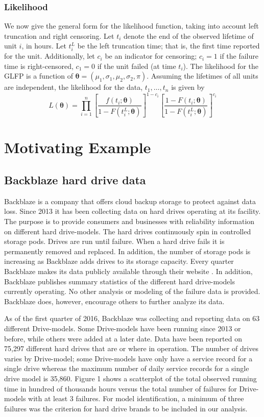 \documentclass[12pt]{article}
\begin{document}
\subsubsection{Likelihood}
We now give the general form for the likelihood function, taking into account left truncation and right censoring.  Let $t_{i}$ denote the end of the observed lifetime of unit $i$, in hours.  Let $t_i^L$ be the left truncation time; that is, the first time reported for the unit.  Additionally, let $c_i$ be an indicator for censoring; $c_i=1$ if the failure time is right-censored, $c_1=0$ if the unit failed (at time $t_i$). The likelihood for the GLFP is a function of $\bm{\theta} = (\mu_1, \sigma_1, \mu_2, \sigma_2, \pi)$.  Assuming the lifetimes of all units are independent, the likelihood for the data, $t_1,\ldots,t_n$ is given by
\begin{equation*}
L(\bm{\theta})= \prod_{i=1}^{n} \left[\frac{f(t_i;\bm{\theta})}{1-F(t_i^L;\bm{\theta})}\right]^{1-c_i} \left[ \frac{1-F(t_i;\bm{\theta})}{1-F(t_i^L;\bm{\theta})} \right]^{c_i}
\end{equation*}

\section{Motivating Example}
\label{sec:Data}
\subsection{Backblaze hard drive data}
Backblaze is a company that offers cloud backup storage to protect against data loss.  Since 2013 it has been collecting data on hard drives operating at its facility.  The purpose is to provide consumers and businesses with reliability information on different hard drive-models.  The hard drives continuously spin in controlled storage pods.  Drives are run until failure.  When a hard drive fails it is permanently removed and replaced.  In addition, the number of storage pods is increasing as Backblaze adds drives to its storage capacity.  Every quarter Backblaze makes its data publicly available through their website \citep{backblaze}. In addition, Backblaze publishes summary statistics of the different hard drive-models currently operating.  No other analysis or modeling of the failure data is provided.  Backblaze does, however, encourage others to further analyze its data. 

As of the first quarter of 2016, Backblaze was collecting and reporting data on 63 different Drive-models.  Some Drive-models have been running since 2013 or before, while others were added at a later date.  Data have been reported on 75,297 different hard drives that are or where in operation.  The number of drives varies by Drive-model; some Drive-models have only have a service record for a single drive whereas the maximum number of daily service records for a single drive model is 35,860.  Figure 1 shows a scatterplot of the total observed running time in hundred of thousands hours versus the total number of failures for Drive-models with at least 3 failures.  For model identification, a minimum of three failures was the criterion for hard drive brands to be included in our analysis.  
\end{document}
